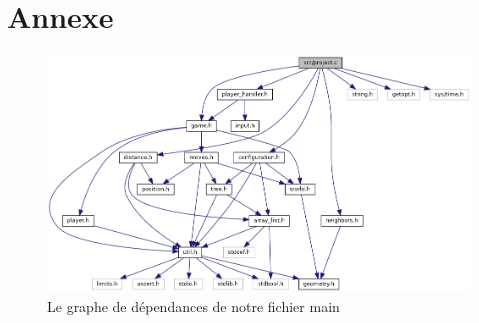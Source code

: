 \section{Annexe}
\begin{figure}[H]
    \centering \includegraphics[width=\linewidth]{images/project_8c__incl.png}
    \caption{Le graphe de dépendances de notre fichier main}
    \label{fig:dep-projet}
\end{figure}
